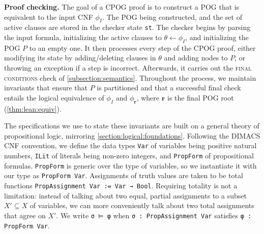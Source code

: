 \documentclass[twoside,11pt]{article}
\newcommand{\inputformula}{\phi_I}
\newcommand{\makenode}[1]{\mathbf{#1}}
\newcommand{\noder}{\makenode{r}}
\begin{document}
\vspace{1em}\noindent
\textbf{Proof checking.} The goal of a CPOG proof is to construct a POG that is equivalent to the input CNF $\inputformula$. The POG being constructed, and the set of active clauses are stored in the checker state \texttt{st}. The checker begins by parsing the input formula, initializing the active clauses to $\theta \leftarrow \inputformula$, and initializing the POG $P$ to an empty one. It then processes every step of the CPOG proof, either modifying its state by adding/deleting clauses in $\theta$ and adding nodes to $P$, or throwing an exception if a step is incorrect. Afterwards, it carries out the \textsc{final conditions} check of \ref{subsection:semantics}. Throughout the process, we maintain invariants that ensure that $P$ is partitioned and that a successful final check entails the logical equivalence of $\inputformula$ and $\phi_\noder$, where $\noder$ is the final POG root (\ref{thm:lean:equiv}).

The specifications we use to state these invariants are built on a general theory of propositional logic, mirroring \ref{section:logical:foundations}. Following the DIMACS CNF convention, we define the data types \lstinline{Var} of variables being positive natural numbers, \lstinline{ILit} of literals being non-zero integers, and \lstinline{PropForm} of propositional formulas. \lstinline{PropForm} is generic over the type of variables, so we instantiate it with our type as \lstinline{PropForm Var}. Assignments of truth values are taken to be total functions \lstinline{PropAssignment Var := Var → Bool}. Requiring totality is not a limitation: instead of talking about two equal, partial assignments to a subset $X' \subseteq X$ of variables, we can more conveniently talk about two total assignments that agree on $X'$. We write \lstinline{σ ⊨ φ} when \lstinline{σ : PropAssignment Var} satisfies \lstinline{φ : PropForm Var}.
\end{document}
